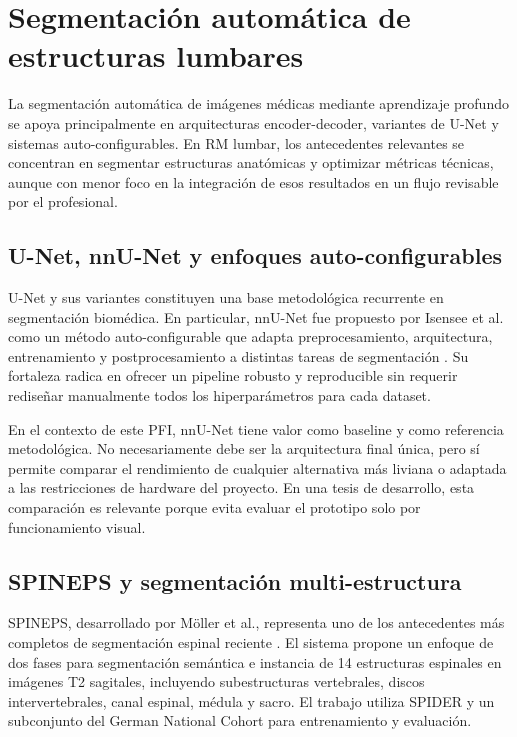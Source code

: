 \section{Segmentación automática de estructuras lumbares}

La segmentación automática de imágenes médicas mediante aprendizaje profundo se apoya principalmente en arquitecturas encoder-decoder, variantes de U-Net y sistemas auto-configurables. En RM lumbar, los antecedentes relevantes se concentran en segmentar estructuras anatómicas y optimizar métricas técnicas, aunque con menor foco en la integración de esos resultados en un flujo revisable por el profesional.

\subsection{U-Net, nnU-Net y enfoques auto-configurables}

U-Net y sus variantes constituyen una base metodológica recurrente en segmentación biomédica. En particular, nnU-Net fue propuesto por Isensee et al. como un método auto-configurable que adapta preprocesamiento, arquitectura, entrenamiento y postprocesamiento a distintas tareas de segmentación \parencite{isensee_nnunet_2021}. Su fortaleza radica en ofrecer un pipeline robusto y reproducible sin requerir rediseñar manualmente todos los hiperparámetros para cada dataset.

En el contexto de este PFI, nnU-Net tiene valor como baseline y como referencia metodológica. No necesariamente debe ser la arquitectura final única, pero sí permite comparar el rendimiento de cualquier alternativa más liviana o adaptada a las restricciones de hardware del proyecto. En una tesis de desarrollo, esta comparación es relevante porque evita evaluar el prototipo solo por funcionamiento visual.

\subsection{SPINEPS y segmentación multi-estructura}

SPINEPS, desarrollado por Möller et al., representa uno de los antecedentes más completos de segmentación espinal reciente \parencite{moller_spineps_2025}. El sistema propone un enfoque de dos fases para segmentación semántica e instancia de 14 estructuras espinales en imágenes T2 sagitales, incluyendo subestructuras vertebrales, discos intervertebrales, canal espinal, médula y sacro. El trabajo utiliza SPIDER y un subconjunto del German National Cohort para entrenamiento y evaluación.

